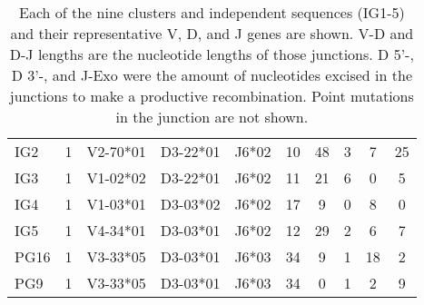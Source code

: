 \begin{table}
{\begin{tabular}{lllllccccc}
IG2              & 1                & V2-70*01    & D3-22*01    & J6*02       & 10                  & 48                  & 3                 & 7                 & 25             \\
IG3              & 1                & V1-02*02    & D3-22*01    & J6*02       & 11                  & 21                  & 6                 & 0                 & 5              \\
IG4              & 1                & V1-03*01    & D3-03*02    & J6*02       & 17                  & 9                   & 0                 & 8                 & 0              \\
IG5              & 1                & V4-34*01    & D3-03*01    & J6*02       & 12                  & 29                  & 2                 & 6                 & 7              \\
PG16             & 1                & V3-33*05    & D3-03*01    & J6*03       & 34                  & 9                   & 1                 & 18                & 2              \\
PG9              & 1                & V3-33*05    & D3-03*01    & J6*03       & 34                  & 0                   & 1                 & 2                 & 9      \\
\bottomrule
\end{tabular}}
\caption[Gene Usage Statistics of PG9-Mimicry Clusters]{Each of the nine clusters and independent sequences (IG1-5) and their representative V, D, and J genes are shown. V-D and D-J lengths are the nucleotide lengths of those junctions. D 5'-, D 3'-, and J-Exo were the amount of nucleotides excised in the junctions to make a productive recombination. Point mutations in the junction are not shown.}
\label{tab:table3_3}
\end{table}

